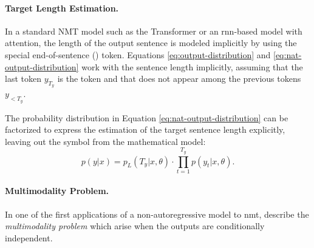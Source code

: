 \paragraph{Target Length Estimation.} In a standard NMT model such as the
Transformer or an \acs{rnn}-based model with attention, the length of the
output sentence is modeled implicitly by using the special end-of-sentence
(\eos{}) token. Equations \ref{eq:output-distribution} and
\ref{eq:nat-output-distribution} work with the sentence length implicitly,
assuming that the last token $y_{T_y}$ is the \eos{} token and that \eos{} does
not appear among the previous tokens $y_{<T_y}$.

The probability distribution in Equation \ref{eq:nat-output-distribution} can
be factorized to express the estimation of the target sentence length
explicitly, leaving out the \eos{} symbol from the mathematical model:
\begin{equation}
  p(y|x) = p_L(T_y|x, \theta) \cdot \prod_{t=1}^{T_y}p(y_t|x,\theta).
  \label{eq:explicit-length}
\end{equation}




\citep{ghazvininejad-etal-2019-mask} \citep{mansimov2019generalized}

\paragraph{Multimodality Problem.} In one of the first applications of a
non-autoregressive model to \ac{nmt}, \citet{gu2017nonautoregressive} describe
the \emph{multimodality problem} which arise when the outputs are conditionally
independent.

